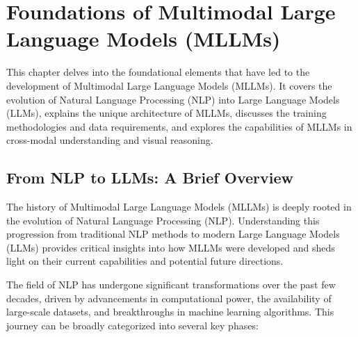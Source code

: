 \chapter{Foundations of Multimodal Large Language Models (MLLMs)}
This chapter delves into the foundational elements that have led to the development of Multimodal Large Language Models (MLLMs). It covers the evolution of Natural Language Processing (NLP) into Large Language Models (LLMs), explains the unique architecture of MLLMs, discusses the training methodologies and data requirements, and explores the capabilities of MLLMs in cross-modal understanding and visual reasoning.

\section{From NLP to LLMs: A Brief Overview}

The history of Multimodal Large Language Models (MLLMs) is deeply rooted in the evolution of Natural Language Processing (NLP). Understanding this progression from traditional NLP methods to modern Large Language Models (LLMs) provides critical insights into how MLLMs were developed and sheds light on their current capabilities and potential future directions.

The field of NLP has undergone significant transformations over the past few decades, driven by advancements in computational power, the availability of large-scale datasets, and breakthroughs in machine learning algorithms. This journey can be broadly categorized into several key phases:

